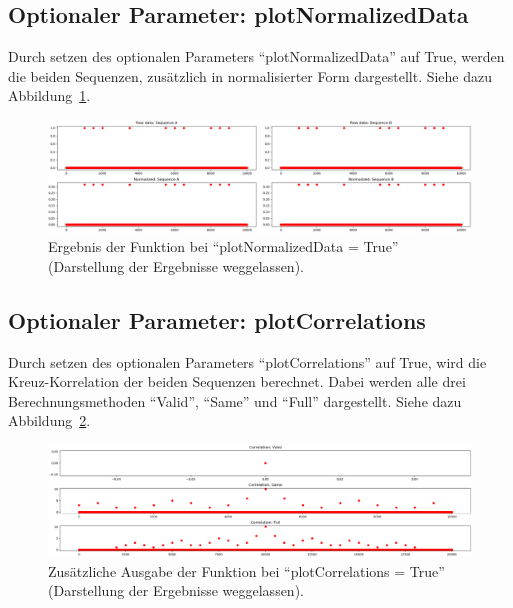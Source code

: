 \subsection{Optionaler Parameter: plotNormalizedData}
Durch setzen des optionalen Parameters \enquote{plotNormalizedData} auf True, werden die beiden Sequenzen, zusätzlich in normalisierter Form dargestellt. 
Siehe dazu Abbildung~\ref{fig:correlationPlotNormalizedData}. 
\begin{figure}[H]
    \includegraphics[width=\linewidth]{./images/correlationPlotNormalizedData.PNG}
    \caption[Ergebnis: plotNormalizedData]{Ergebnis der Funktion bei \enquote{plotNormalizedData = True} (Darstellung der Ergebnisse weggelassen)\footnotemark. }
    \label{fig:correlationPlotNormalizedData}
\end{figure}

\subsection{Optionaler Parameter: plotCorrelations}
Durch setzen des optionalen Parameters \enquote{plotCorrelations} auf True, 
wird die Kreuz-Korrelation der beiden Sequenzen berechnet.
Dabei werden alle drei Berechnungsmethoden \enquote{Valid}, \enquote{Same} und \enquote{Full} dargestellt.
Siehe dazu Abbildung~\ref{fig:correlationPlotCorrelations}. 
\begin{figure}[H]
    \includegraphics[width=\linewidth]{./images/correlationPlotCorrelations.PNG}
    \caption[Ergebnis: plotCorrelations]{Zusätzliche Ausgabe der Funktion bei \enquote{plotCorrelations = True} (Darstellung der Ergebnisse weggelassen)\footnotemark. }
    \label{fig:correlationPlotCorrelations}
\end{figure}

